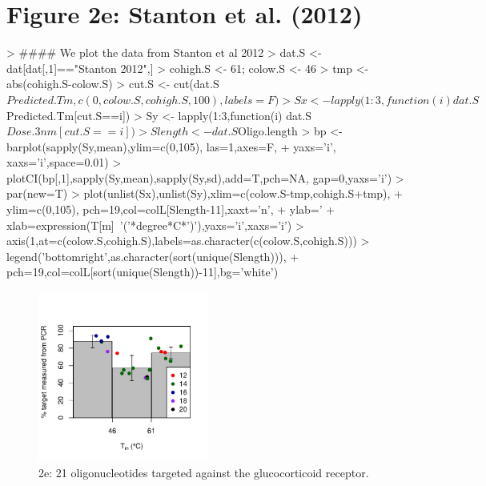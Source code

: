 \documentclass{article}
\newenvironment{Ncenter}{%
  \setlength\topsep{-10pt}
  \setlength\parskip{-100pt}
  \begin{center}
}{%
  \end{center}
}
\begin{document}
\section*{Figure 2e: Stanton et al. (2012)}
\begin{Schunk}
\begin{Sinput}
> #### We plot the data from Stanton et al 2012
> dat.S <- dat[dat[,1]=="Stanton 2012",]
> cohigh.S <- 61; colow.S <- 46
> tmp <- abs(cohigh.S-colow.S)
> cut.S <- cut(dat.S$Predicted.Tm,c(0,colow.S,cohigh.S,100),labels=F)
> Sx <- lapply(1:3,function(i)dat.S$Predicted.Tm[cut.S==i])
> Sy <- lapply(1:3,function(i) dat.S$Dose.3nm[cut.S==i])
> Slength <- dat.S$Oligo.length
> bp <- barplot(sapply(Sy,mean),ylim=c(0,105), las=1,axes=F,
+               yaxs='i', xaxs='i',space=0.01)
> plotCI(bp[,1],sapply(Sy,mean),sapply(Sy,sd),add=T,pch=NA, gap=0,yaxs='i')
> par(new=T)
> plot(unlist(Sx),unlist(Sy),xlim=c(colow.S-tmp,cohigh.S+tmp),
+      ylim=c(0,105), pch=19,col=colL[Slength-11],xaxt='n',
+      ylab='%
+      xlab=expression(T[m]~'('*degree*C*')'),yaxs='i',xaxs='i')
> axis(1,at=c(colow.S,cohigh.S),labels=as.character(c(colow.S,cohigh.S)))
> legend('bottomright',as.character(sort(unique(Slength))),
+        pch=19,col=colL[sort(unique(Slength))-11],bg='white')
\end{Sinput}
\end{Schunk}
\begin{figure}[!h]
\begin{Ncenter}
\includegraphics[width=0.5\textwidth]{Vignette2-Fig5}
\end{Ncenter}
\caption{2e: 21 oligonucleotides targeted against the glucocorticoid receptor.}
\end{figure}
\end{document}
